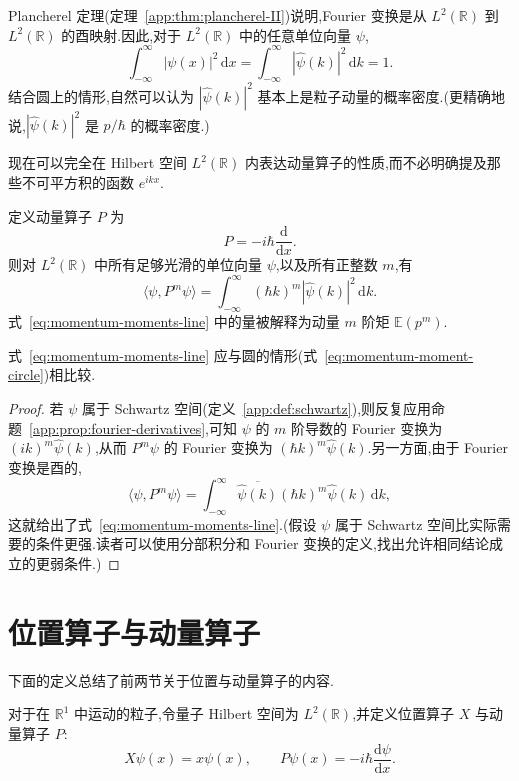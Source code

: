 Plancherel 定理(定理~\ref{app:thm:plancherel-II})说明,Fourier 变换是从 \(L^{2}(\mathbb{R})\) 到 \(L^{2}(\mathbb{R})\) 的酉映射.因此,对于 \(L^{2}(\mathbb{R})\) 中的任意单位向量 \(\psi\),
\[
\int_{-\infty}^{\infty}|\psi(x)|^{2}\,\mathrm{d}x
=\int_{-\infty}^{\infty}|\widehat{\psi}(k)|^{2}\,\mathrm{d}k=1.
\]
结合圆上的情形,自然可以认为 \(|\widehat{\psi}(k)|^{2}\) 基本上是粒子动量的概率密度.(更精确地说,\(|\widehat{\psi}(k)|^{2}\) 是 \(p/\hbar\) 的概率密度.)

现在可以完全在 Hilbert 空间 \(L^{2}(\mathbb{R})\) 内表达动量算子的性质,而不必明确提及那些不可平方积的函数 \(e^{ikx}\).

\begin{proposition}[动量算子的矩]\label{prop:momentum-moments}
定义动量算子 \(P\) 为
\[
P=-i\hbar\frac{\mathrm{d}}{\mathrm{d}x}.
\]
则对 \(L^{2}(\mathbb{R})\) 中所有足够光滑的单位向量 \(\psi\),以及所有正整数 \(m\),有
\begin{equation}
\langle\psi,P^{m}\psi\rangle
=\int_{-\infty}^{\infty}(\hbar k)^{m}|\widehat{\psi}(k)|^{2}\,\mathrm{d}k.
\label{eq:momentum-moments-line}
\end{equation}
式~\eqref{eq:momentum-moments-line} 中的量被解释为动量 \(m\) 阶矩 \(\mathbb{E}(p^{m})\).
\end{proposition}

式~\eqref{eq:momentum-moments-line} 应与圆的情形(式~\eqref{eq:momentum-moment-circle})相比较.

\begin{proof}
若 \(\psi\) 属于 Schwartz 空间(定义~\ref{app:def:schwartz}),则反复应用命题~\ref{app:prop:fourier-derivatives},可知 \(\psi\) 的 \(m\) 阶导数的 Fourier 变换为 \((ik)^{m}\widehat{\psi}(k)\),从而 \(P^{m}\psi\) 的 Fourier 变换为 \((\hbar k)^{m}\widehat{\psi}(k)\).另一方面,由于 Fourier 变换是酉的,
\[
\langle\psi,P^{m}\psi\rangle
=\int_{-\infty}^{\infty}\overline{\widehat{\psi}(k)}(\hbar k)^{m}\widehat{\psi}(k)\,\mathrm{d}k,
\]
这就给出了式~\eqref{eq:momentum-moments-line}.(假设 \(\psi\) 属于 Schwartz 空间比实际需要的条件更强.读者可以使用分部积分和 Fourier 变换的定义,找出允许相同结论成立的更弱条件.)
\end{proof}

\section{位置算子与动量算子}\label{sec:position-momentum}

下面的定义总结了前两节关于位置与动量算子的内容.

\begin{definition}[位置与动量算子]\label{def:position-momentum}
对于在 \(\mathbb{R}^{1}\) 中运动的粒子,令量子 Hilbert 空间为 \(L^{2}(\mathbb{R})\),并定义位置算子 \(X\) 与动量算子 \(P\):
\[
X\psi(x)=x\psi(x),\qquad
P\psi(x)=-i\hbar\frac{\mathrm{d}\psi}{\mathrm{d}x}.
\]
\end{definition}

